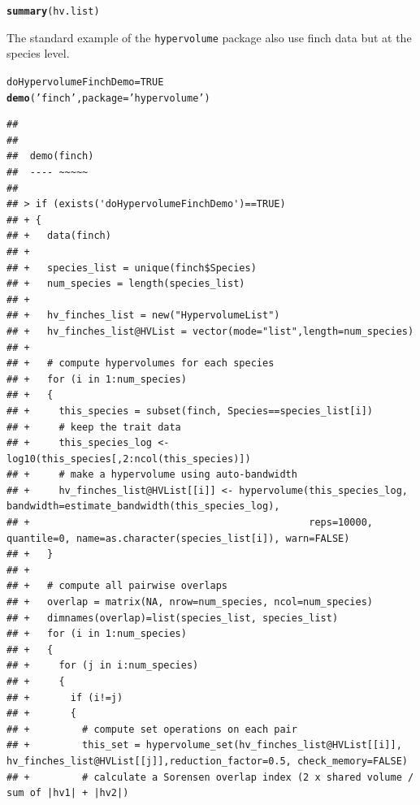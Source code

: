 \documentclass[12pt]{article}\usepackage[]{graphicx}\usepackage[]{color}
\makeatletter
\newcommand{\hlnum}[1]{\textcolor[rgb]{0.686,0.059,0.569}{#1}}%
\newcommand{\hlstr}[1]{\textcolor[rgb]{0.192,0.494,0.8}{#1}}%
\newcommand{\hlstd}[1]{\textcolor[rgb]{0.345,0.345,0.345}{#1}}%
\newcommand{\hlkwb}[1]{\textcolor[rgb]{0.69,0.353,0.396}{#1}}%
\newcommand{\hlkwc}[1]{\textcolor[rgb]{0.333,0.667,0.333}{#1}}%
\newcommand{\hlkwd}[1]{\textcolor[rgb]{0.737,0.353,0.396}{\textbf{#1}}}%
\newenvironment{kframe}{%
 \def\at@end@of@kframe{}%
 \ifinner\ifhmode%
  \def\at@end@of@kframe{\end{minipage}}%
  \begin{minipage}{\columnwidth}%
 \fi\fi%
 \def\FrameCommand##1{\hskip\@totalleftmargin \hskip-\fboxsep
 \colorbox{shadecolor}{##1}\hskip-\fboxsep
     \hskip-\linewidth \hskip-\@totalleftmargin \hskip\columnwidth}%
 \MakeFramed {\advance\hsize-\width
   \@totalleftmargin\z@ \linewidth\hsize
   \@setminipage}}%
 {\par\unskip\endMakeFramed%
 \at@end@of@kframe}
\newenvironment{knitrout}{}{} %
\makeatother
\begin{document}
\begin{knitrout}
\end{knitrout}

\begin{knitrout}
\color{fgcolor}\begin{kframe}
\begin{alltt}
\hlkwd{summary}\hlstd{(hv.list)}
\end{alltt}
\end{kframe}
\end{knitrout}

The standard example of the \texttt{hypervolume} package also use finch data but at the species level.

\begin{knitrout}
\color{fgcolor}\begin{kframe}
\begin{alltt}
\hlstd{doHypervolumeFinchDemo}\hlkwb{=}\hlnum{TRUE}
\hlkwd{demo}\hlstd{(}\hlstr{'finch'}\hlstd{,} \hlkwc{package} \hlstd{=} \hlstr{'hypervolume'}\hlstd{)}
\end{alltt}
\begin{verbatim}
## 
## 
## 	demo(finch)
## 	---- ~~~~~
## 
## > if (exists('doHypervolumeFinchDemo')==TRUE)
## + {
## +   data(finch)
## +   
## +   species_list = unique(finch$Species)
## +   num_species = length(species_list)
## +   
## +   hv_finches_list = new("HypervolumeList")
## +   hv_finches_list@HVList = vector(mode="list",length=num_species)
## +   
## +   # compute hypervolumes for each species
## +   for (i in 1:num_species)
## +   {
## +     this_species = subset(finch, Species==species_list[i])
## +     # keep the trait data
## +     this_species_log <- log10(this_species[,2:ncol(this_species)])
## +     # make a hypervolume using auto-bandwidth
## +     hv_finches_list@HVList[[i]] <- hypervolume(this_species_log, bandwidth=estimate_bandwidth(this_species_log),
## +                                                reps=10000, quantile=0, name=as.character(species_list[i]), warn=FALSE)
## +   }
## +   
## +   # compute all pairwise overlaps
## +   overlap = matrix(NA, nrow=num_species, ncol=num_species)
## +   dimnames(overlap)=list(species_list, species_list)
## +   for (i in 1:num_species)
## +   {
## +     for (j in i:num_species)
## +     {
## +       if (i!=j)
## +       {
## +         # compute set operations on each pair
## +         this_set = hypervolume_set(hv_finches_list@HVList[[i]], hv_finches_list@HVList[[j]],reduction_factor=0.5, check_memory=FALSE)
## +         # calculate a Sorensen overlap index (2 x shared volume / sum of |hv1| + |hv2|)

\end{verbatim}
\end{kframe}
\end{knitrout}
\end{document}
